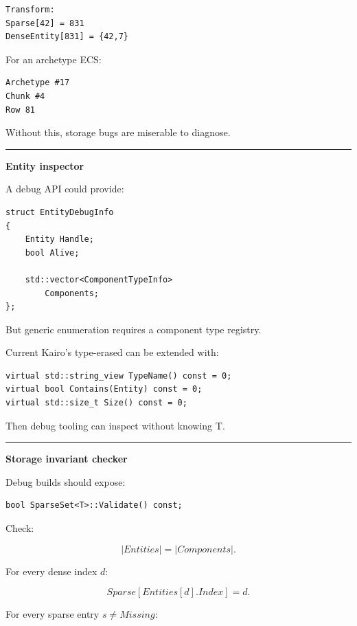 \begin{verbatim}
Transform:
Sparse[42] = 831
DenseEntity[831] = {42,7}
\end{verbatim}

For an archetype ECS:

\begin{verbatim}
Archetype #17
Chunk #4
Row 81
\end{verbatim}

Without this, storage bugs are miserable to diagnose.

\begin{center}\rule{0.5\linewidth}{0.5pt}\end{center}

\textbf{Entity inspector}

A debug API could provide:

\begin{verbatim}
struct EntityDebugInfo
{
    Entity Handle;
    bool Alive;

    std::vector<ComponentTypeInfo>
        Components;
};
\end{verbatim}

But generic enumeration requires a component type registry.

Current Kairo's type-erased  can be extended with:

\begin{verbatim}
virtual std::string_view TypeName() const = 0;
virtual bool Contains(Entity) const = 0;
virtual std::size_t Size() const = 0;
\end{verbatim}

Then debug tooling can inspect without knowing T.

\begin{center}\rule{0.5\linewidth}{0.5pt}\end{center}

\textbf{Storage invariant checker}

Debug builds should expose:

\begin{verbatim}
bool SparseSet<T>::Validate() const;
\end{verbatim}

Check:

\[
|Entities|=|Components|.
\]

For every dense index \(d\):

\[
Sparse[Entities[d].Index]=d.
\]

For every sparse entry \(s\neq Missing\):

